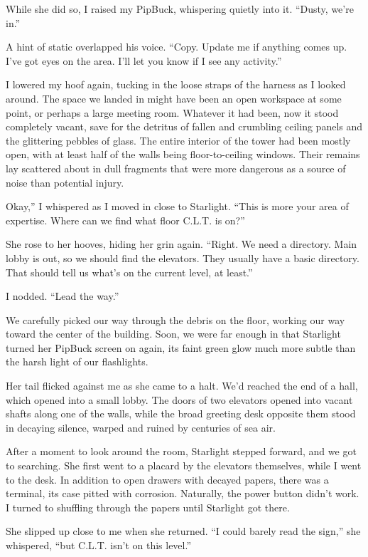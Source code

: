 While she did so, I raised my PipBuck, whispering quietly into it. “Dusty, we’re in.”

A hint of static overlapped his voice. “Copy. Update me if anything comes up. I’ve got eyes on the area. I’ll let you know if I see any activity.”

I lowered my hoof again, tucking in the loose straps of the harness as I looked around. The space we landed in might have been an open workspace at some point, or perhaps a large meeting room. Whatever it had been, now it stood completely vacant, save for the detritus of fallen and crumbling ceiling panels and the glittering pebbles of glass. The entire interior of the tower had been mostly open, with at least half of the walls being floor-to-ceiling windows. Their remains lay scattered about in dull fragments that were more dangerous as a source of noise than potential injury.

\leavevmode{}Okay,” I whispered as I moved in close to Starlight. “This is more your area of expertise. Where can we find what floor C.L.T. is on?”

She rose to her hooves, hiding her grin again. “Right. We need a directory. Main lobby is out, so we should find the elevators. They usually have a basic directory. That should tell us what’s on the current level, at least.”

I nodded. “Lead the way.”

We carefully picked our way through the debris on the floor, working our way toward the center of the building. Soon, we were far enough in that Starlight turned her PipBuck screen on again, its faint green glow much more subtle than the harsh light of our flashlights.

Her tail flicked against me as she came to a halt. We’d reached the end of a hall, which opened into a small lobby. The doors of two elevators opened into vacant shafts along one of the walls, while the broad greeting desk opposite them stood in decaying silence, warped and ruined by centuries of sea air.

After a moment to look around the room, Starlight stepped forward, and we got to searching. She first went to a placard by the elevators themselves, while I went to the desk. In addition to open drawers with decayed papers, there was a terminal, its case pitted with corrosion. Naturally, the power button didn’t work. I turned to shuffling through the papers until Starlight got there.

She slipped up close to me when she returned. “I could barely read the sign,” she whispered, “but C.L.T. isn’t on this level.”

